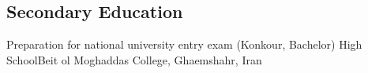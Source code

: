 {          \subsection{Secondary Education}
           {Preparation for national university entry exam (Konkour, Bachelor)}{}{}{}{}
           {High School}{Beit ol Moghaddas College, Ghaemshahr, Iran}{}{}{}
         


}